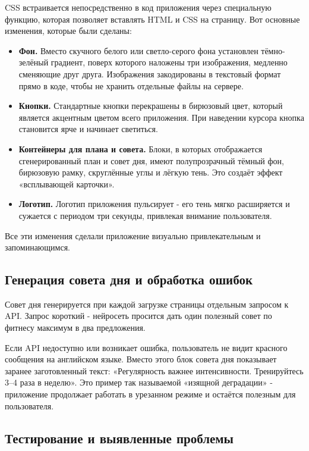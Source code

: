 \documentclass[14pt, a4paper]{extarticle}
\begin{document}
\begin{enumerate}
\medskip
\noindent CSS встраивается непосредственно в код приложения через специальную функцию, которая позволяет вставлять HTML и CSS на страницу. Вот основные изменения, которые были сделаны:

\begin{itemize}
\item \textbf{Фон.} Вместо скучного белого или светло-серого фона установлен тёмно-зелёный градиент, поверх которого наложены три изображения, медленно сменяющие друг друга. Изображения закодированы в текстовый формат прямо в коде, чтобы не хранить отдельные файлы на сервере.

\item \textbf{Кнопки.} Стандартные кнопки перекрашены в бирюзовый цвет, который является акцентным цветом всего приложения. При наведении курсора кнопка становится ярче и начинает светиться.

\item \textbf{Контейнеры для плана и совета.} Блоки, в которых отображается сгенерированный план и совет дня, имеют полупрозрачный тёмный фон, бирюзовую рамку, скруглённые углы и лёгкую тень. Это создаёт эффект «всплывающей карточки».

\item \textbf{Логотип.} Логотип приложения пульсирует - его тень мягко расширяется и сужается с периодом три секунды, привлекая внимание пользователя.
\end{itemize}

\noindent Все эти изменения сделали приложение визуально привлекательным и запоминающимся.

\subsection{Генерация совета дня и обработка ошибок}

\noindent Совет дня генерируется при каждой загрузке страницы отдельным запросом к API. Запрос короткий - нейросеть просится дать один полезный совет по фитнесу максимум в два предложения.

\medskip
\noindent Если API недоступно или возникает ошибка, пользователь не видит красного сообщения на английском языке. Вместо этого блок совета дня показывает заранее заготовленный текст: «Регулярность важнее интенсивности. Тренируйтесь 3–4 раза в неделю». Это пример так называемой «изящной деградации» - приложение продолжает работать в урезанном режиме и остаётся полезным для пользователя.

\subsection{Тестирование и выявленные проблемы}


\end{enumerate}
\end{document}
